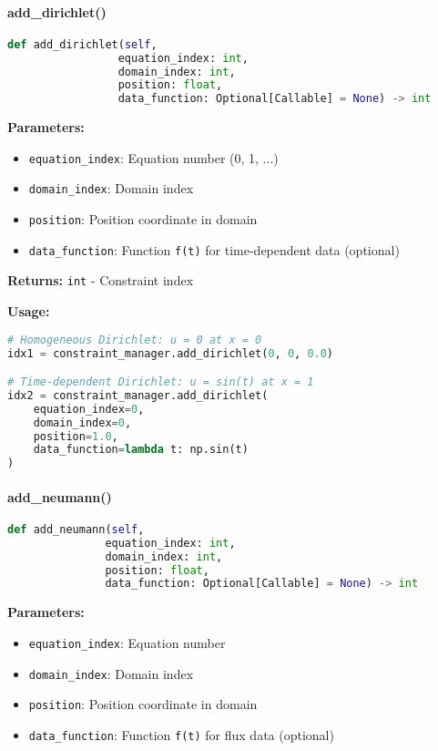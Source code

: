 \paragraph{add\_dirichlet()}\leavevmode
\begin{lstlisting}[language=Python, caption=Add Dirichlet Method]
def add_dirichlet(self, 
                 equation_index: int, 
                 domain_index: int, 
                 position: float,
                 data_function: Optional[Callable] = None) -> int
\end{lstlisting}

\textbf{Parameters:}
\begin{itemize}
    \item \texttt{equation\_index}: Equation number (0, 1, ...)
    \item \texttt{domain\_index}: Domain index
    \item \texttt{position}: Position coordinate in domain
    \item \texttt{data\_function}: Function \texttt{f(t)} for time-dependent data (optional)
\end{itemize}

\textbf{Returns:} \texttt{int} - Constraint index

\textbf{Usage:}
\begin{lstlisting}[language=Python, caption=Add Dirichlet Usage]
# Homogeneous Dirichlet: u = 0 at x = 0
idx1 = constraint_manager.add_dirichlet(0, 0, 0.0)

# Time-dependent Dirichlet: u = sin(t) at x = 1
idx2 = constraint_manager.add_dirichlet(
    equation_index=0,
    domain_index=0, 
    position=1.0,
    data_function=lambda t: np.sin(t)
)
\end{lstlisting}

\paragraph{add\_neumann()}\leavevmode
\begin{lstlisting}[language=Python, caption=Add Neumann Method]
def add_neumann(self, 
               equation_index: int, 
               domain_index: int, 
               position: float,
               data_function: Optional[Callable] = None) -> int
\end{lstlisting}

\textbf{Parameters:}
\begin{itemize}
    \item \texttt{equation\_index}: Equation number
    \item \texttt{domain\_index}: Domain index
    \item \texttt{position}: Position coordinate in domain
    \item \texttt{data\_function}: Function \texttt{f(t)} for flux data (optional)
\end{itemize}

